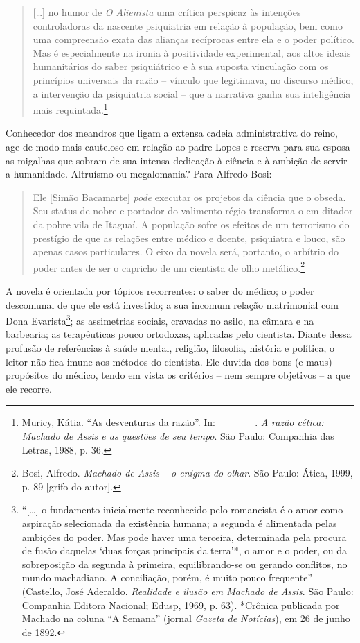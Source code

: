 \begin{quote}
{[}\ldots{}{]} no humor de \emph{O Alienista} uma crítica perspicaz às
intenções controladoras da nascente psiquiatria em relação à população,
bem como uma compreensão exata das alianças recíprocas entre ela e o
poder político. Mas é especialmente na ironia à positividade
experimental, aos altos ideais humanitários do saber psiquiátrico e à
sua suposta vinculação com os princípios universais da razão -- vínculo
que legitimava, no discurso médico, a intervenção da psiquiatria social
-- que a narrativa ganha sua inteligência mais requintada.\footnote{Muricy,
  Kátia. ``As desventuras da razão''. In: \_\_\_\_\_. \emph{A razão
  cética: Machado de Assis e as questões de seu tempo}. São Paulo:
  Companhia das Letras, 1988, p. 36.}
\end{quote}

Conhecedor dos meandros que ligam a extensa cadeia administrativa do
reino, age de modo mais cauteloso em relação ao padre Lopes e reserva
para sua esposa as migalhas que sobram de sua intensa dedicação à
ciência e à ambição de servir a humanidade. Altruísmo ou megalomania?
Para Alfredo Bosi:

\begin{quote}
Ele {[}Simão Bacamarte{]} \emph{pode} executar os projetos da ciência
que o obseda. Seu status de nobre e portador do valimento régio
transforma-o em ditador da pobre vila de Itaguaí. A população sofre os
efeitos de um terrorismo do prestígio de que as relações entre médico e
doente, psiquiatra e louco, são apenas casos particulares. O eixo da
novela será, portanto, o arbítrio do poder antes de ser o capricho de um
cientista de olho metálico.\footnote{Bosi, Alfredo. \emph{Machado de
  Assis -- o enigma do olhar}. São Paulo: Ática, 1999, p. 89 {[}grifo do
  autor{]}.}
\end{quote}

A novela é orientada por tópicos recorrentes: o saber do médico; o poder
descomunal de que ele está investido; a sua incomum relação matrimonial
com Dona Evarista\footnote{``{[}\ldots{}{]} o fundamento inicialmente
  reconhecido pelo romancista é o amor como aspiração selecionada da
  existência humana; a segunda é alimentada pelas ambições do poder. Mas
  pode haver uma terceira, determinada pela procura de fusão daquelas
  `duas forças principais da terra'*, o amor e o poder, ou da
  sobreposição da segunda à primeira, equilibrando-se ou gerando
  conflitos, no mundo machadiano. A conciliação, porém, é muito pouco
  frequente'' (Castello, José Aderaldo. \emph{Realidade e ilusão em
  Machado de Assis}. São Paulo: Companhia Editora Nacional; Edusp, 1969,
  p. 63). *Crônica publicada por Machado na coluna ``A Semana'' (jornal
  \emph{Gazeta de Notícias}), em 26 de junho de 1892.}; as assimetrias
sociais, cravadas no asilo, na câmara e na barbearia; as terapêuticas
pouco ortodoxas, aplicadas pelo cientista. Diante dessa profusão de
referências à saúde mental, religião, filosofia, história e política, o
leitor não fica imune aos métodos do cientista. Ele duvida dos bons (e
maus) propósitos do médico, tendo em vista os critérios -- nem sempre
objetivos -- a que ele recorre.

